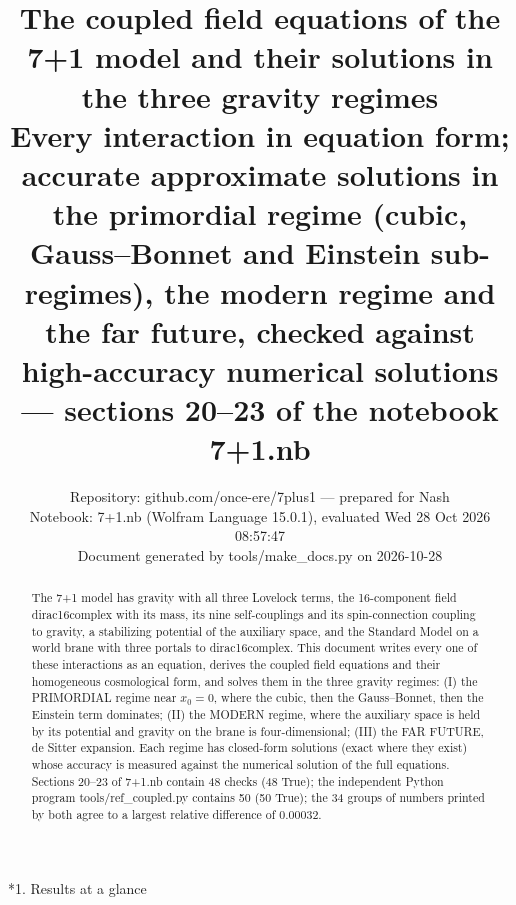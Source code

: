 \documentclass[10pt,a4paper]{article}
\makeatletter
\renewcommand\section{\@startsection{section}{1}{\z@}{-3.5ex \@plus -1ex \@minus -.2ex}{2.3ex \@plus.2ex}{\normalfont\Large\bfseries\raggedright}}
\makeatother
\begin{document}
\title{The coupled field equations of the 7+1 model and their solutions in the three gravity regimes\\[0.4em]\large Every interaction in equation form; accurate approximate solutions in the primordial regime (cubic, Gauss–Bonnet and Einstein sub-regimes), the modern regime and the far future, checked against high-accuracy numerical solutions — sections 20–23 of the notebook 7+1.nb}
\author{Repository: github.com/once-ere/7plus1 — prepared for Nash\\ Notebook: 7+1.nb (Wolfram Language 15.0.1), evaluated Wed 28 Oct 2026 08:57:47\\ Document generated by tools/make\_docs.py on 2026-10-28}
\date{}
\maketitle
\begin{abstract}
The 7+1 model has gravity with all three Lovelock terms, the 16-component field dirac16complex with its mass, its nine self-couplings and its spin-connection coupling to gravity, a stabilizing potential of the auxiliary space, and the Standard Model on a world brane with three portals to dirac16complex. This document writes every one of these interactions as an equation, derives the coupled field equations and their homogeneous cosmological form, and solves them in the three gravity regimes: (I) the PRIMORDIAL regime near $x_0=0$, where the cubic, then the Gauss–Bonnet, then the Einstein term dominates; (II) the MODERN regime, where the auxiliary space is held by its potential and gravity on the brane is four-dimensional; (III) the FAR FUTURE, de Sitter expansion. Each regime has closed-form solutions (exact where they exist) whose accuracy is measured against the numerical solution of the full equations. Sections 20–23 of 7+1.nb contain 48 checks (48 True); the independent Python program tools/ref\_coupled.py contains 50 (50 True); the 34 groups of numbers printed by both agree to a largest relative difference of 0.00032.
\end{abstract}
\tableofcontents
{}\section*{1. Results at a glance}
\end{document}
